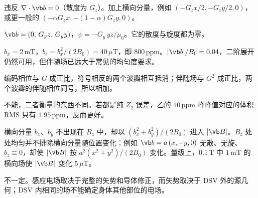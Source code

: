 \begin{answers}
\item 违反 $\nabla\cdot\vb b=0$（散度为 $G_z$）。加上横向分量，例如 $(-G_zx/2,-G_zy/2,0)$，或更一般的 $(-\alpha G_zx,-(1-\alpha)G_zy,0)$。
\item $\vb b=(0,\,G_yz,\,G_yy)$，$\psi=-G_y\,yz/\mu_0$。它的散度与旋度都为零。
\item $b_x=2\,\mathrm{mT}$，$b_c=b_x^2/(2B_0)=40\,\mu\mathrm T$，即 $800\,\mathrm{ppm}$。$|\vb b|/B_0=0.04$，二阶展开仍然可用，但伴随场已远大于常见的均匀度要求。
\item 编码相位与 $G$ 成正比，符号相反的两个波瓣相互抵消；伴随场与 $G^2$ 成正比，两个波瓣的伴随相位同号，所以相加。
\item 不能，二者衡量的东西不同。若都是纯 $Z_2$ 误差，乙的 $10\,\mathrm{ppm}$ 峰峰值对应的体积 RMS 只有 $1.95\,\mathrm{ppm}$，反而更好。
\item 横向分量 $b_x$、$b_y$ 不出现在 $B_z$ 中，却以 $(b_x^2+b_y^2)/(2B_0)$ 进入 $|\vb B|$。$B_z$ 处处均匀并不排除横向分量随位置变化：例如 $\vb b=a\,(x,-y,0)$ 无散、无旋、$b_z\equiv0$，却使 $|\vb B|$ 按 $a^2(x^2+y^2)/(2B_0)$ 变化。量级上，$0.1\,\mathrm T$ 中 $1\,\mathrm{mT}$ 的横向场使 $|\vb B|$ 变化 $5\,\mu\mathrm T$。
\item 不一定。感应电场取决于完整的矢势和导体修正，而矢势取决于 DSV 外的源几何；DSV 内相同的场不能确定身体其他部位的电场。
\end{answers}
